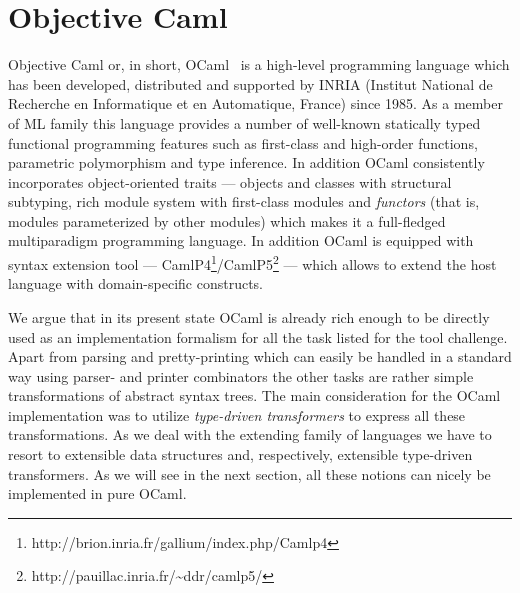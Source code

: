 \section{Objective Caml}

Objective Caml or, in short, OCaml~\cite{OcamlDef, Remy} is a high-level programming language which 
has been developed, distributed and supported by INRIA (Institut National de Recherche en 
Informatique et en Automatique, France) since 1985. As a member of ML family this language 
provides a number of well-known statically typed functional programming features such as
first-class and high-order functions, parametric polymorphism and type inference. In addition
OCaml consistently incorporates object-oriented traits --- objects and classes with 
structural subtyping, rich module system with first-class modules and \emph{functors} (that is, 
modules parameterized by other modules) which makes it a full-fledged multiparadigm programming
language. In addition OCaml is equipped with syntax extension tool --- 
CamlP4\footnote{http://brion.inria.fr/gallium/index.php/Camlp4}/CamlP5\footnote{http://pauillac.inria.fr/\textasciitilde ddr/camlp5/} --- which allows to extend the host language with domain-specific constructs. 

We argue that in its present state OCaml is already rich enough to be directly used as an 
implementation formalism for all the task listed for the tool challenge. Apart from parsing and 
pretty-printing which can easily be handled in a standard way using parser- and printer combinators 
the other tasks are rather simple transformations of abstract syntax trees. The main consideration
for the OCaml implementation was to utilize \emph{type-driven transformers} to express all these
transformations. As we deal with the extending family of languages we have to resort to extensible
data structures and, respectively, extensible type-driven transformers. As we will see in the next 
section, all these notions can nicely be implemented in pure OCaml. 

